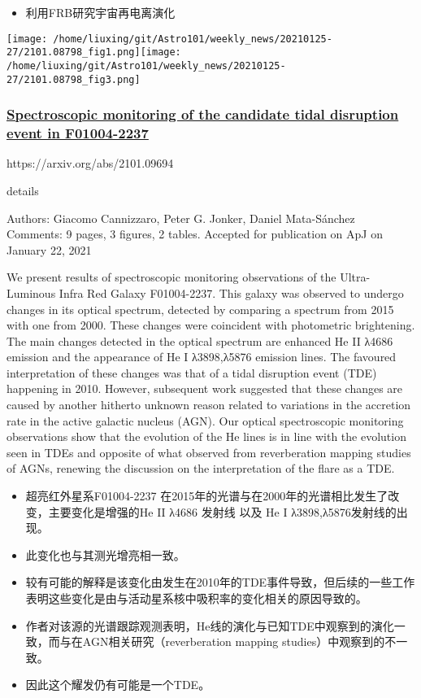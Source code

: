 \documentclass[
]{article}
\begin{document}
\begin{itemize}
\item
  利用FRB研究宇宙再电离演化
\end{itemize}

\texttt{[image: /home/liuxing/git/Astro101/weekly\_news/20210125-27/2101.08798\_fig1.png]}\texttt{[image: /home/liuxing/git/Astro101/weekly\_news/20210125-27/2101.08798\_fig3.png]}

\hypertarget{header-n14}{%
\subsubsection{\texorpdfstring{\href{./2101.09694.pdf}{Spectroscopic
monitoring of the candidate tidal disruption event in
F01004-2237}}{Spectroscopic monitoring of the candidate tidal disruption event in F01004-2237}}\label{header-n14}}

https://arxiv.org/abs/2101.09694

details

Authors: Giacomo Cannizzaro, Peter G. Jonker, Daniel Mata-Sánchez\\
Comments: 9 pages, 3 figures, 2 tables. Accepted for publication on ApJ
on January 22, 2021

We present results of spectroscopic monitoring observations of the
Ultra-Luminous Infra Red Galaxy F01004-2237. This galaxy was observed to
undergo changes in its optical spectrum, detected by comparing a
spectrum from 2015 with one from 2000. These changes were coincident
with photometric brightening. The main changes detected in the optical
spectrum are enhanced He II λ4686 emission and the appearance of He I
λ3898,λ5876 emission lines. The favoured interpretation of these changes
was that of a tidal disruption event (TDE) happening in 2010. However,
subsequent work suggested that these changes are caused by another
hitherto unknown reason related to variations in the accretion rate in
the active galactic nucleus (AGN). Our optical spectroscopic monitoring
observations show that the evolution of the He lines is in line with the
evolution seen in TDEs and opposite of what observed from reverberation
mapping studies of AGNs, renewing the discussion on the interpretation
of the flare as a TDE.

\begin{itemize}
\item
  超亮红外星系F01004-2237
  在2015年的光谱与在2000年的光谱相比发生了改变，主要变化是增强的He II
  λ4686 发射线 以及 He I λ3898,λ5876发射线的出现。
\item
  此变化也与其测光增亮相一致。
\item
  较有可能的解释是该变化由发生在2010年的TDE事件导致，但后续的一些工作表明这些变化是由与活动星系核中吸积率的变化相关的原因导致的。
\item
  作者对该源的光谱跟踪观测表明，He线的演化与已知TDE中观察到的演化一致，而与在AGN相关研究（reverberation
  mapping studies）中观察到的不一致。
\item
  因此这个耀发仍有可能是一个TDE。
\end{itemize}
\end{document}
